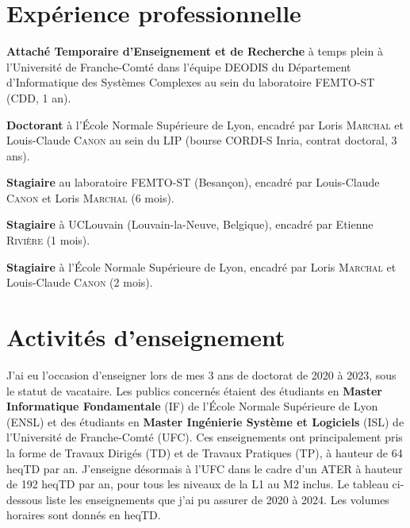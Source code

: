 \documentclass[12pt]{article}
\newcommand{\cvitem}[2]{\item[#1] #2}
\newcounter{cvitems}
\begin{document}
\section{Expérience professionnelle}

\begin{cvitems}
    \cvitem{2023--2024}{\textbf{Attaché Temporaire d'Enseignement et de Recherche} à temps plein à
    l'Université de Franche-Comté dans l'équipe DEODIS du Département d'Informatique des Systèmes
    Complexes au sein du laboratoire FEMTO-ST (CDD, 1 an).}

    \cvitem{2020--2023}{\textbf{Doctorant} à l'École Normale Supérieure de Lyon, encadré par Loris
    \textsc{Marchal} et Louis-Claude \textsc{Canon} au sein du LIP (bourse CORDI-S Inria, contrat
    doctoral, 3 ans).}

    \cvitem{2020}{\textbf{Stagiaire} au laboratoire FEMTO-ST (Besançon), encadré par Louis-Claude
    \textsc{Canon} et Loris \textsc{Marchal} (6 mois).}

    \cvitem{2019}{\textbf{Stagiaire} à UCLouvain (Louvain-la-Neuve, Belgique), encadré par Etienne
    \textsc{Rivière} (1 mois).}

    \cvitem{2019}{\textbf{Stagiaire} à l'École Normale Supérieure de Lyon, encadré par Loris
    \textsc{Marchal} et Louis-Claude \textsc{Canon} (2 mois).}
\end{cvitems}

\section{Activités d'enseignement}

J'ai eu l'occasion d'enseigner lors de mes 3 ans de doctorat de 2020 à 2023, sous le statut de
vacataire.  
Les publics concernés étaient des étudiants en \textbf{Master Informatique Fondamentale} (IF) de
l'École Normale Supérieure de Lyon (ENSL) et des étudiants en \textbf{Master Ingénierie Système et
Logiciels} (ISL) de l'Université de Franche-Comté (UFC).  
Ces enseignements ont principalement pris la forme de Travaux Dirigés (TD) et de Travaux Pratiques
(TP), à hauteur de 64 heqTD par an.  
J'enseigne désormais à l'UFC dans le cadre d'un ATER à hauteur de 192 heqTD par an, pour tous les
niveaux de la L1 au M2 inclus.  
Le tableau ci-dessous liste les enseignements que j'ai pu assurer de 2020 à 2024.  
Les volumes horaires sont donnés en heqTD.
\end{document}
